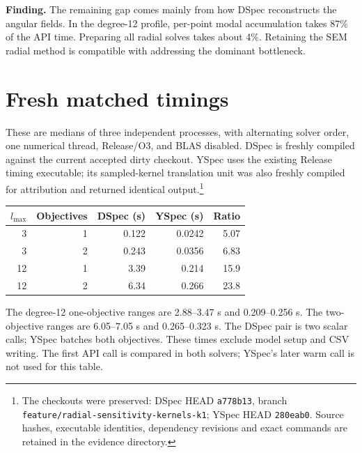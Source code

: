 \documentclass[11pt,a4paper]{article}
\begin{document}
\textbf{Finding.} The remaining gap comes mainly from how DSpec reconstructs the angular fields. In the degree-12 profile, per-point modal accumulation takes 87\% of the API time. Preparing all radial solves takes about 4\%. Retaining the SEM radial method is compatible with addressing the dominant bottleneck.

\section{Fresh matched timings}
These are medians of three independent processes, with alternating solver order, one numerical thread, Release/O3, and BLAS disabled. DSpec is freshly compiled against the current accepted dirty checkout. YSpec uses the existing Release timing executable; its sampled-kernel translation unit was also freshly compiled for attribution and returned identical output.\footnote{The checkouts were preserved: DSpec HEAD \texttt{a778b13}, branch \texttt{feature/radial-sensitivity-kernels-k1}; YSpec HEAD \texttt{280eab0}. Source hashes, executable identities, dependency revisions and exact commands are retained in the evidence directory.}
\begin{center}
\begin{tabular}{rrrrr}
\toprule
$l_{\max}$ & Objectives & DSpec (s) & YSpec (s) & Ratio\\
\midrule
3 & 1 & 0.122 & 0.0242 & 5.07\\
3 & 2 & 0.243 & 0.0356 & 6.83\\
12 & 1 & 3.39 & 0.214 & 15.9\\
12 & 2 & 6.34 & 0.266 & 23.8\\
\bottomrule
\end{tabular}
\end{center}
The degree-12 one-objective ranges are 2.88--3.47 s and 0.209--0.256 s. The two-objective ranges are 6.05--7.05 s and 0.265--0.323 s. The DSpec pair is two scalar calls; YSpec batches both objectives. These times exclude model setup and CSV writing. The first API call is compared in both solvers; YSpec's later warm call is not used for this table.
\end{document}
